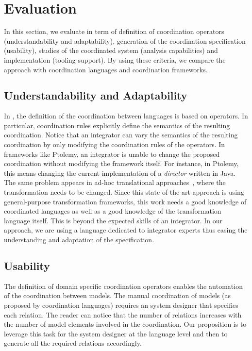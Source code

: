 \section{Evaluation}
\label{sec:evaluation}
In this section, we evaluate \bcool in term of definition of coordination operators (\ie understandability and adaptability), generation of the coordination specification (\ie usability), studies of the coordinated system (\ie analysis capabilities) and implementation (\ie tooling support).  By using these criteria, we compare the approach with coordination languages and coordination frameworks.

\subsection{Understandability and Adaptability}
In \bcool, the definition of the coordination between languages is based on operators. In particular, coordination rules explicitly define the semantics of the resulting coordination. Notice that an integrator can vary the semantics of the resulting coordination by only modifying the coordination rules of the operators. In frameworks like Ptolemy, an integrator is unable to change the proposed coordination without modifying the framework itself. For instance, in Ptolemy, this means changing the current implementation of a \emph{director} written in Java. The same problem appears in ad-hoc translational approaches~\cite{dinatale}, where the transformation needs to be changed. Since this state-of-the-art approach is using general-purpose transformation frameworks, this work needs a good knowledge of coordinated languages as well as a good knowledge of the transformation language itself. This is beyond the expected skills of an integrator. In our approach, we are using a language dedicated to integrator experts thus easing the understanding and adaptation of the \bcool specification. 

\subsection{Usability}
The definition of domain specific coordination operators enables the automation of the coordination between models. The manual coordination of models (as proposed by coordination languages) requires an system designer that specifies each relation. The reader can notice that the number of relations increases with the number of model elements involved in the coordination. Our proposition is to leverage this task for the system designer at the language level and then to generate all the required relations accordingly.

